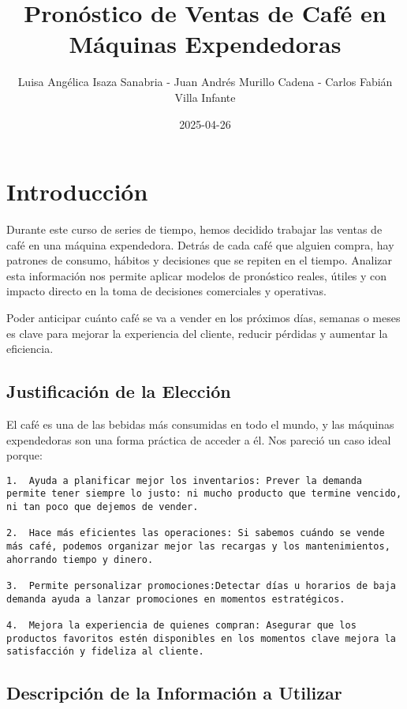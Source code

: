 \documentclass[
]{book}
\title{Pronóstico de Ventas de Café en Máquinas Expendedoras}
\author{Luisa Angélica Isaza Sanabria - Juan Andrés Murillo Cadena - Carlos Fabián Villa Infante}
\date{2025-04-26}
\begin{document}
\maketitle

{
\setcounter{tocdepth}{1}
\tableofcontents
}
\chapter{Introducción}\label{introducciuxf3n}

Durante este curso de series de tiempo, hemos decidido trabajar las ventas de café en una máquina expendedora. Detrás de cada café que alguien compra, hay patrones de consumo, hábitos y decisiones que se repiten en el tiempo. Analizar esta información nos permite aplicar modelos de pronóstico reales, útiles y con impacto directo en la toma de decisiones comerciales y operativas.

Poder anticipar cuánto café se va a vender en los próximos días, semanas o meses es clave para mejorar la experiencia del cliente, reducir pérdidas y aumentar la eficiencia.

\section{Justificación de la Elección}\label{justificaciuxf3n-de-la-elecciuxf3n}

El café es una de las bebidas más consumidas en todo el mundo, y las máquinas expendedoras son una forma práctica de acceder a él. Nos pareció un caso ideal porque:

\begin{verbatim}
1.  Ayuda a planificar mejor los inventarios: Prever la demanda permite tener siempre lo justo: ni mucho producto que termine vencido, ni tan poco que dejemos de vender.

2.  Hace más eficientes las operaciones: Si sabemos cuándo se vende más café, podemos organizar mejor las recargas y los mantenimientos, ahorrando tiempo y dinero.

3.  Permite personalizar promociones:Detectar días u horarios de baja demanda ayuda a lanzar promociones en momentos estratégicos.

4.  Mejora la experiencia de quienes compran: Asegurar que los productos favoritos estén disponibles en los momentos clave mejora la satisfacción y fideliza al cliente.
\end{verbatim}

\section{Descripción de la Información a Utilizar}\label{descripciuxf3n-de-la-informaciuxf3n-a-utilizar}
\end{document}
